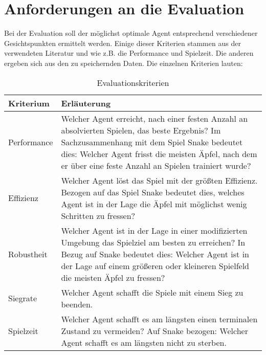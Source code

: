 \section{Anforderungen an die Evaluation} \label{sec:Anforderungen_an_die_Evaluation}
Bei der Evaluation soll der möglichst optimale Agent entsprechend verschiedener Gesichtspunkten ermittelt werden.
Einige dieser Kriterien stammen aus der verwendeten Literatur \cite{Autonomous_Agents_in_Snake_Game_via_DRL} und \cite{UAV} wie z.B. die Performance und Spielzeit. Die anderen ergeben sich aus den zu speichernden Daten.
Die einzelnen Kriterien lauten:
\begin{longtable}[h]{|p{4cm}|p{\linewidth - 5cm}|}
	\caption{Evaluationskriterien}
	\label{tab:Kriterien} 
	\endfirsthead
	\endhead
	\hline
	Kriterium & Erläuterung \\
	\hline
	Performance & Welcher Agent erreicht, nach einer festen Anzahl an absolvierten Spielen, das beste Ergebnis? Im Sachzusammenhang mit dem Spiel Snake bedeutet dies: Welcher Agent frisst die meisten Äpfel, nach dem er über eine feste Anzahl an Spielen trainiert wurde? \\
	\hline
	Effizienz & Welcher Agent löst das Spiel mit der größten Effizienz. Bezogen auf das Spiel Snake bedeutet dies, welches Agent ist in der Lage die Äpfel mit möglichst wenig Schritten zu fressen? \\
	\hline
	Robustheit & Welcher Agent ist in der Lage in einer modifizierten Umgebung das Spielziel am besten zu erreichen? In Bezug auf Snake bedeutet dies: Welcher Agent ist in der Lage auf einem größeren oder kleineren Spielfeld die meisten Äpfel zu fressen? \\
	\hline
	Siegrate & Welcher Agent schafft die Spiele mit einem Sieg zu beenden. \\
	\hline
	Spielzeit & Welcher Agent schafft es am längsten einen terminalen Zustand zu vermeiden? Auf Snake bezogen: Welcher Agent schafft es am längsten nicht zu sterben. \\
	\hline
\end{longtable}